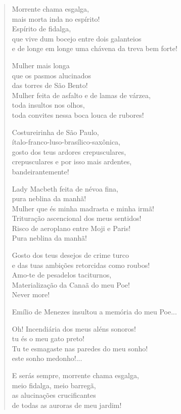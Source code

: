 \begin{verse}
Morrente chama esgalga,\\
mais morta inda no espírito!\\
Espírito de fidalga,\\
que vive dum bocejo entre dois galanteios\\
e de longe em longe uma chávena da treva bem forte!

Mulher mais longa\\
que os pasmos alucinados\\
das torres de São Bento!\\
Mulher feita de asfalto e de lamas de várzea,\\
toda insultos nos olhos,\\
toda convites nessa boca louca de rubores!

Costureirinha de São Paulo,\\
ítalo-franco-luso-brasílico-saxônica,\\
gosto dos teus ardores crepusculares,\\
crepusculares e por isso mais ardentes,\\
bandeirantemente!

Lady Macbeth feita de névoa fina,\\
pura neblina da manhã!\\
Mulher que és minha madrasta e minha irmã!\\
Trituração ascencional dos meus sentidos!\\
Risco de aeroplano entre Moji e Paris!\\
Pura neblina da manhã!

Gosto dos teus desejos de crime turco\\
e das tuas ambições retorcidas como roubos!\\
Amo-te de pesadelos taciturnos,\\
Materialização da Canaã do meu Poe!\\
Never more!

Emílio de Menezes insultou a memória do meu Poe...

Oh! Incendiária dos meus aléns sonoros!\\
tu és o meu gato preto!\\
Tu te esmagaste nas paredes do meu sonho!\\
este sonho medonho!...

E serás sempre, morrente chama esgalga,\\
meio fidalga, meio barregã,\\
as alucinações crucificantes\\
de todas as auroras de meu jardim!
\end{verse}


